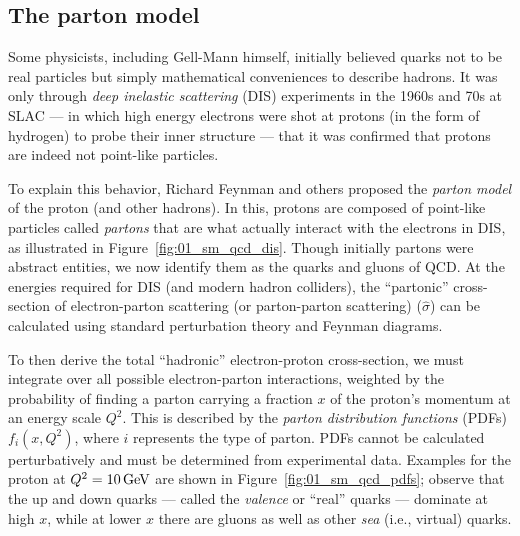 

\subsection{The parton model}
\label{sec:01_sm_qcd_quarks_parton}

Some physicists, including Gell-Mann himself, initially believed quarks not to be real particles but simply mathematical conveniences to describe hadrons.
It was only through \textit{deep inelastic scattering} (DIS) experiments in the 1960s and 70s at SLAC --- in which high energy electrons were shot at protons (in the form of hydrogen) to probe their inner structure --- that it was confirmed that protons are indeed not point-like particles.

To explain this behavior, Richard Feynman and others proposed the \textit{parton model} of the proton (and other hadrons).
In this, protons are composed of point-like particles called \textit{partons} that are what actually interact with the electrons in DIS, as illustrated in Figure~\ref{fig:01_sm_qcd_dis}.
Though initially partons were abstract entities, we now identify them as the quarks and gluons of QCD.
At the energies required for DIS (and modern hadron colliders), the ``partonic'' cross-section of electron-parton scattering (or parton-parton scattering) ($\hat\sigma$) can be calculated using standard perturbation theory and Feynman diagrams.

To then derive the total ``hadronic'' electron-proton cross-section, we must integrate over all possible electron-parton interactions, weighted by the probability of finding a parton carrying a fraction $x$ of the proton's momentum at an energy scale $Q^2$.
This is described by the \textit{parton distribution functions} (PDFs) $f_i(x, Q^2)$, where $i$ represents the type of parton.
PDFs cannot be calculated perturbatively and must be determined from experimental data.
Examples for the proton at $Q^2 = 10 \,\text{Ge\hspace{-.08em}V}$ are shown in Figure~\ref{fig:01_sm_qcd_pdfs}; observe that the up and down quarks --- called the \textit{valence} or ``real'' quarks --- dominate at high $x$, while at lower $x$ there are gluons as well as other \textit{sea} (i.e., virtual) quarks.

